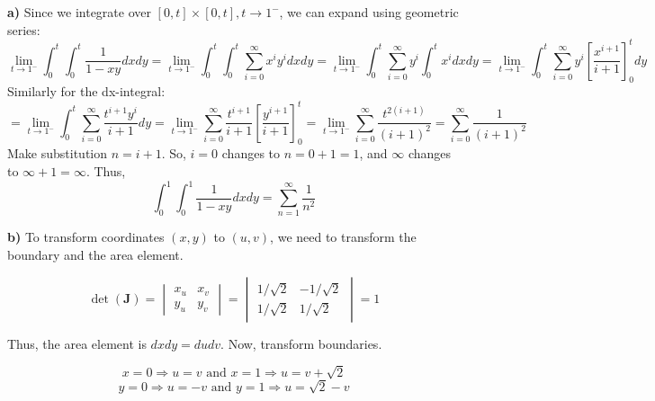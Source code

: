 \documentclass{article}
\begin{document}
\textbf{a)} Since we integrate over $[0,t] \times [0,t], t \rightarrow 1^-$, we can expand using geometric series:
\begin{equation*}
  \lim_{t \rightarrow 1^-}\int_0^t \int_0^t \frac{1}{1-xy} dxdy = \lim_{t \rightarrow 1^-} \int_0^t \int_0^t \sum_{i=0}^\infty x^iy^i dxdy = \lim_{t \rightarrow 1^-} \int_0^t \sum_{i=0}^\infty y^i \int_0^t x^i dxdy = \lim_{t \rightarrow 1^-} \int_0^t \sum_{i=0}^\infty y^i [\frac{x^{i+1}}{i+1}]_0^t dy
\end{equation*}
Similarly for the dx-integral:
\begin{equation*}
  = \lim_{t \rightarrow 1^-} \int_0^t \sum_{i=0}^\infty \frac{t^{i+1}y^i}{i+1} dy = \lim_{t \rightarrow 1^-} \sum_{i=0}^{\infty} \frac{t^{i+1}}{i+1} [\frac{y^{i+1}}{i+1}]_0^t = \lim_{t \rightarrow 1^-} \sum_{i=0}^\infty \frac{t^{2(i+1)}}{(i+1)^2} = \sum_{i=0}^\infty \frac{1}{(i+1)^2} 
\end{equation*}
Make substitution $n = i+1$. So, $i=0$ changes to $n=0+1=1$, and $\infty$ changes to $\infty+1=\infty$. Thus,
\begin{equation*}
  \int_0^1 \int_0^1 \frac{1}{1-xy} dxdy = \sum_{n=1}^\infty \frac{1}{n^2}
\end{equation*}

\textbf{b)} To transform coordinates $(x,y)$ to $(u, v)$, we need to transform the boundary and the area element.

\begin{equation*}
  \det (\mathbf{J}) = \begin{vmatrix}
x_u & x_v \\
y_u & y_v 
  \end{vmatrix} = \begin{vmatrix}
    1/\sqrt{2} & -1/\sqrt{2} \\
    1/\sqrt{2} & 1/\sqrt{2}
    \end{vmatrix} = 1
\end{equation*}

Thus, the area element is $dxdy = dudv$. Now, transform boundaries. 

\begin{equation*}
  x = 0 \Rightarrow u = v \mbox{ and } x = 1 \Rightarrow u = v + \sqrt{2}
\end{equation*}
\begin{equation*}
  y = 0 \Rightarrow u = -v \mbox{ and } y = 1 \Rightarrow u = \sqrt{2} - v
\end{equation*}
\end{document}
